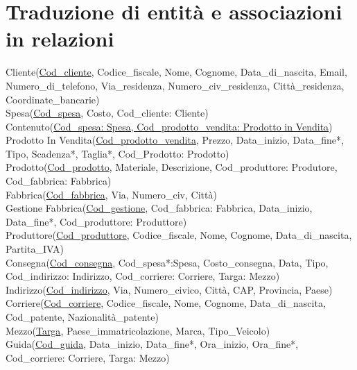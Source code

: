 \documentclass[a4paper,12pt]{report}
\begin{document}
\section{Traduzione di entità e associazioni in relazioni}
Cliente(\underline{Cod\_cliente}, Codice\_fiscale, Nome, Cognome, Data\_di\_nascita, Email, Numero\_di\_telefono, Via\_residenza, Numero\_civ\_residenza, Città\_residenza, Coordinate\_bancarie)\\
Spesa(\underline{Cod\_spesa}, Costo, Cod\_cliente: Cliente)\\
Contenuto(\underline{Cod\_spesa: Spesa, Cod\_prodotto\_vendita: Prodotto in Vendita})\\
Prodotto In Vendita(\underline{Cod\_prodotto\_vendita}, Prezzo, Data\_inizio, Data\_fine*, Tipo, Scadenza*, Taglia*, Cod\_Prodotto: Prodotto)\\
Prodotto(\underline{Cod\_prodotto}, Materiale, Descrizione, Cod\_produttore: Produtore, Cod\_fabbrica: Fabbrica)\\
Fabbrica(\underline{Cod\_fabbrica}, Via, Numero\_civ, Città)\\
Gestione Fabbrica(\underline{Cod\_gestione}, Cod\_fabbrica: Fabbrica, Data\_inizio, Data\_fine*, Cod\_produttore: Produttore)\\
Produttore(\underline{Cod\_produttore}, Codice\_fiscale, Nome, Cognome, Data\_di\_nascita, Partita\_IVA)\\
Consegna(\underline{Cod\_consegna}, Cod\_spesa*:Spesa, Costo\_consegna, Data, Tipo, Cod\_indirizzo: Indirizzo, Cod\_corriere: Corriere, Targa: Mezzo)\\
Indirizzo(\underline{Cod\_indirizzo}, Via, Numero\_civico, Città, CAP, Provincia, Paese)\\
Corriere(\underline{Cod\_corriere}, Codice\_fiscale, Nome, Cognome, Data\_di\_nascita, Cod\_patente, Nazionalità\_patente)\\
Mezzo(\underline{Targa}, Paese\_immatricolazione, Marca, Tipo\_Veicolo)\\
Guida(\underline{Cod\_guida}, Data\_inizio, Data\_fine*, Ora\_inizio, Ora\_fine*, Cod\_corriere: Corriere, Targa: Mezzo)\\
\end{document}

